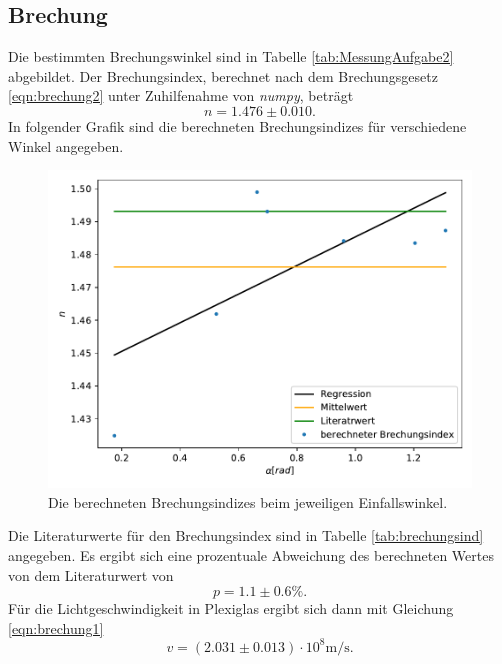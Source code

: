 \subsection{Brechung}
\label{sec:brechungauswertung}
Die bestimmten Brechungswinkel sind in Tabelle \ref{tab:MessungAufgabe2} abgebildet.
Der Brechungsindex, berechnet nach dem Brechungsgesetz \eqref{eqn:brechung2} unter Zuhilfenahme von \textit{numpy}\cite{numpy},
beträgt
\begin{equation*}
  n = 1.476 \pm 0.010.
  \label{eqn:brechungsindexausw}
\end{equation*}
In folgender Grafik sind die berechneten Brechungsindizes für verschiedene Winkel angegeben.
\begin{figure}[H]
  \centering
  \includegraphics[scale=0.7]{auswertung/plot2.pdf}
  \caption{Die berechneten Brechungsindizes beim jeweiligen Einfallswinkel.}
  \label{fig:plot2ausw}
\end{figure}
\noindent
Die Literaturwerte für den Brechungsindex sind in Tabelle \ref{tab:brechungsind} angegeben.
Es ergibt sich eine prozentuale Abweichung des berechneten Wertes von dem Literaturwert von
\begin{equation*}
  p = 1.1 \pm 0.6 \si{\percent}.
  \label{eqn:abweichung}
\end{equation*}
Für die Lichtgeschwindigkeit in Plexiglas ergibt sich dann mit Gleichung \ref{eqn:brechung1}
\begin{equation*}
  v=(2.031 \pm 0.013) \cdot 10^8 \si{\meter\per\second}.
  \label{eqn:lichtgeschwausw}
\end{equation*}

